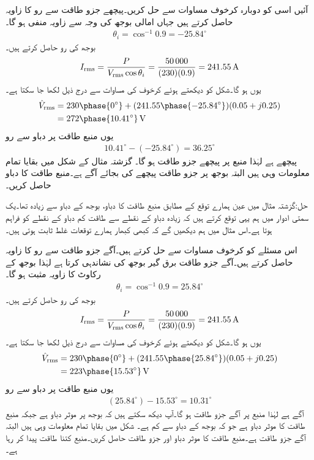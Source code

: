 آئیں اسی کو دوبارہ کرخوف مساوات سے حل کریں۔پیچھے جزو طاقت  سے رو کا زاویہ حاصل کرتے ہیں جہاں امالی بوجھ کی وجہ سے زاویہ منفی ہو گا۔
\begin{align*}
\theta_i=\cos^{-1} 0.9=-25.84^{\circ}
\end{align*}
بوجھ کی رو حاصل کرتے ہیں۔
\begin{align*}
{\ensuremath{I_{\textup{rms}}}}=\frac{P}{{V_{\textup{rms}}} \cos \theta_i}=\frac{\num{50000}}{(230)(0.9)}=\SI{241.55}{\ampere}
\end{align*}
یوں  ہو گا۔شکل کو دیکھتے ہوئے کرخوف کی مساوات سے درج ذیل لکھا جا سکتا ہے۔
\begin{align*}
\hat{V}_{\textup{rms}}&=230\phase{0^{\circ}}+(241.55\phase{-25.84^{\circ}})(0.05+j0.25)\\
&=272\phase{10.41^{\circ}}\,\si{\volt}
\end{align*}
یوں منبع طاقت پر دباو سے رو
\begin{align*}
10.41^{\circ}-(-25.84^{\circ})=36.25^{\circ}
\end{align*}
پیچھے ہے لہٰذا منبع پر پیچھے جزو طاقت  ہو گا۔
گزشتہ مثال کے شکل  میں بقایا تمام معلومات وہی ہیں البتہ بوجھ پر جزو طاقت پیچھے کی بجائے آگے ہے۔منبع طاقت کا دباو حاصل کریں۔

حل:گزشتہ مثال میں عین ہمارے توقع کے مطابق منبع طاقت کا دباو، بوجھ کے دباو سے زیادہ تھا۔یک سمتی ادوار میں ہم یہی توقع کرتے ہیں کہ زیادہ دباو کے نقطے سے طاقت  کم دباو کے نقطے  کو فراہم ہوتا ہے۔اس مثال میں ہم دیکھیں گے کہ کبھی کبھار ہمارے توقعات غلط ثابت ہوتی ہیں۔ 
 
اس مسئلے کو کرخوف مساوات سے حل کرتے ہیں۔آگے جزو طاقت  سے رو کا زاویہ حاصل کرتے ہیں۔آگے جزو طاقت برق گیر بوجھ کی نشاندہی کرتا ہے لہٰذا بوجھ کے رکاوٹ کا زاویہ مثبت ہو گا۔
\begin{align*}
\theta_i=\cos^{-1} 0.9=25.84^{\circ}
\end{align*}
بوجھ کی رو حاصل کرتے ہیں۔
\begin{align*}
{\ensuremath{I_{\textup{rms}}}}=\frac{P}{{V_{\textup{rms}}} \cos \theta_i}=\frac{\num{50000}}{(230)(0.9)}=\SI{241.55}{\ampere}
\end{align*}
یوں  ہو گا۔شکل کو دیکھتے ہوئے کرخوف کی مساوات سے درج ذیل لکھا جا سکتا ہے۔
\begin{align*}
\hat{V}_{\textup{rms}}&=230\phase{0^{\circ}}+(241.55\phase{25.84^{\circ}})(0.05+j0.25)\\
&=223\phase{15.53^{\circ}}\,\si{\volt}
\end{align*}
یوں منبع طاقت پر دباو سے رو
\begin{align*}
(25.84^{\circ})-15.53^{\circ}=10.31^{\circ}
\end{align*}
آگے  ہے لہٰذا منبع پر آگے جزو طاقت  ہو گا۔آپ دیکھ سکتے ہیں کہ بوجھ پر موثر دباو  ہے جبکہ منبع طاقت کا موثر دباو  ہے جو کہ بوجھ کے دباو سے کم ہے۔
شکل  میں بقایا تمام معلومات وہی ہیں البتہ آگے جزو طاقت  ہے۔منبع طاقت کا موثر دباو اور جزو طاقت حاصل کریں۔منبع کتنا طاقت پیدا کر رہا ہے۔

